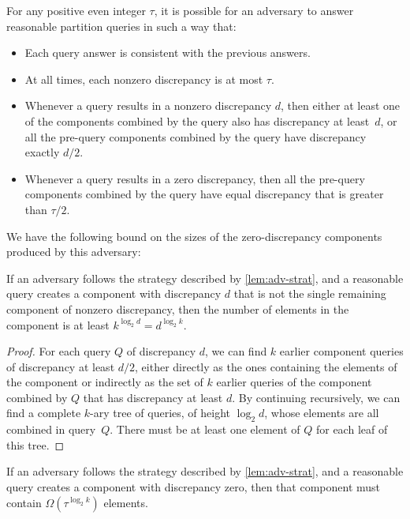 \documentclass[11pt]{llncs}
\newcommand{\threshold}{\tau}
\begin{document}
\begin{lemma}
\label{lem:adv-strat}
For any positive even integer $\threshold$, it is possible for an adversary to answer reasonable partition queries in such a way that:
\begin{itemize}
\item Each query answer is consistent with the previous answers.
\item At all times, each nonzero discrepancy is at most $\threshold$.
\item Whenever a query results in a nonzero discrepancy $d$, then either at least one of the components combined by the query also has discrepancy at least~$d$, or all the pre-query components combined by the query have discrepancy exactly $d/2$.
\item Whenever a query results in a zero discrepancy, then all the pre-query components combined by the query have equal discrepancy that is greater than $\threshold/2$.
\end{itemize}
\end{lemma}

We have the following bound on the sizes of the zero-discrepancy components produced by this adversary:

\begin{lemma}
If an adversary follows the strategy described by \autoref{lem:adv-strat}, and a reasonable query creates a component with discrepancy $d$ that is not the single remaining component of nonzero discrepancy, then the number of elements in the component is at least $k^{\log_2 d}=d^{\log_2 k}$.
\end{lemma}

\begin{proof}
For each query $Q$ of discrepancy $d$, we can find $k$ earlier component queries of discrepancy at least $d/2$, either directly as the ones containing the elements of the component or indirectly as the set of $k$ earlier queries of the component combined by $Q$ that has discrepancy at least $d$.
By continuing recursively, we can find a complete $k$-ary tree of queries, of height $\log_2 d$, whose elements are all combined in query~$Q$. There must be at least one element of $Q$ for each leaf of this tree.
\end{proof}

\begin{corollary}
\label{cor:zero-components}
If an adversary follows the strategy described by \autoref{lem:adv-strat}, and a reasonable query creates a component with discrepancy zero, then that component must contain $\Omega(\threshold^{\log_2 k})$ elements.
\end{corollary}
\end{document}
